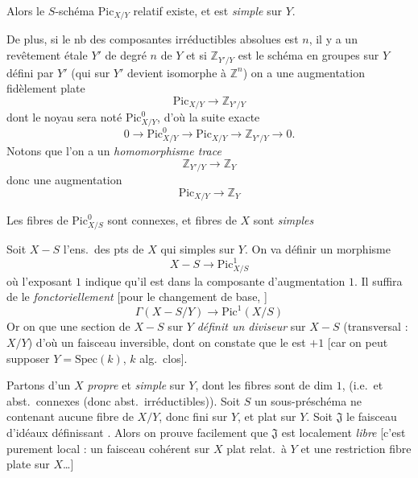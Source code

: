 \documentclass[11pt,a4paper]{article}
\begin{document}
Alors le $S$-schéma $\mathrm{Pic}_{X/Y}$ relatif existe, et est
\emph{simple} sur $Y$.

De plus, si le nb des composantes irréductibles absolues est $n$, il y a un
revêtement étale $Y'$ de degré $n$ de $Y$ et si $\mathbb{Z}_{Y'/Y}$ est le
schéma en groupes sur $Y$ défini par $Y'$ (qui sur $Y'$ devient isomorphe à
$\mathbb{Z}^n$) on a une augmentation  fidèlement plate
\[
\mathrm{Pic}_{X/Y} \longrightarrow \mathbb{Z}_{Y'/Y}
\]
dont le noyau sera noté $\mathrm{Pic}^{0}_{X/Y}$, d'où la suite exacte
\[
0 \to \mathrm{Pic}^{0}_{X/Y} \to \mathrm{Pic}_{X/Y} \to \mathbb{Z}_{Y'/Y} \to 0.
\]
Notons que l'on a un \emph{homomorphisme trace}
\[
\mathbb{Z}_{Y'/Y} \longrightarrow \mathbb{Z}_Y
\]
donc une augmentation
\[
\mathrm{Pic}_{X/Y} \longrightarrow \mathbb{Z}_Y
\]

Les fibres de $\mathrm{Pic}^{0}_{X/S}$ sont connexes, et 
 fibres de $X$ sont \emph{simples}

Soit \struck{\ill{}} $X - S$ l'ens.\ des pts de $X$ qui 
 simples sur $Y$. On va définir un morphisme
\[
\boxed{X - S \longrightarrow \mathrm{Pic}^{1}_{X/S}}
\]
où l'exposant $1$ indique qu'il est dans la composante d'augmentation $1$.
Il suffira de le  \emph{fonctoriellement} [pour le
changement de base,  \ill{}] 
\[
\Gamma(X - S/Y) \longrightarrow \mathrm{Pic}^{1}(X/S)
\]
Or on  que une section de $X - S$ sur $Y$ \emph{définit un
diviseur} sur $X - S$ (transversal : $X/Y$)
d'où un faisceau inversible, dont on constate que le 
\struck{\ill{}} est $+1$ [car on peut supposer $Y = \mathrm{Spec}(k)$, $k$
alg.\ clos].

Partons d'un $X$ \emph{propre} et \emph{simple} sur $Y$, dont les fibres
sont de dim $1$,  (i.e.\ et abst.\ connexes (donc
abst.\ irréductibles)). Soit $S$ un sous-préschéma 
 ne contenant aucune fibre de $X/Y$, donc fini
sur $Y$, et plat sur $Y$. Soit $\mathfrak{J}$ le faisceau d'idéaux
définissant . Alors on prouve facilement que $\mathfrak{J}$
est localement \emph{libre} [c'est purement local : un faisceau cohérent sur
$X$ plat relat.\ à $Y$ et \ill{} \ill{} une restriction 
 fibre plate sur $X$\ldots]
\end{document}
